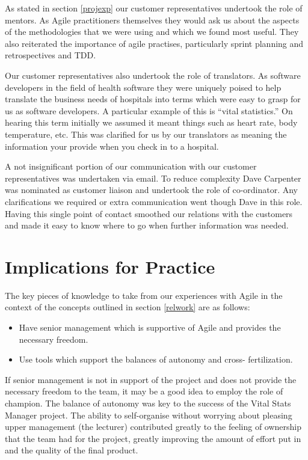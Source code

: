 \documentclass[conference]{IEEEtran}
\begin{document}
As stated in section \ref{projexp} our customer representatives undertook the
role of mentors. As Agile practitioners themselves they would ask us about the
aspects of the methodologies that we were using and which we found most useful.
They also reiterated the importance of agile practises, particularly sprint
planning and retrospectives and TDD.

Our customer representatives also undertook the role of translators. As software
developers in the field of health software they were uniquely poised to help
translate the business needs of hospitals into terms which were easy to grasp
for us as software developers. A particular example of this is ``vital
statistics.'' On hearing this term initially we assumed it meant things such as
heart rate, body temperature, etc. This was clarified for us by our translators
as meaning the information your provide when you check in to a hospital.

A not insignificant portion of our communication with our customer
representatives was undertaken via email. To reduce complexity Dave Carpenter
was nominated as customer liaison and undertook the role of co-ordinator. Any
clarifications we required or extra communication went though Dave in this role.
Having this single point of contact smoothed our relations with the customers
and made it easy to know where to go when further information was needed.

\section{Implications for Practice}

The key pieces of knowledge to take from our experiences with Agile in the
context of the concepts outlined in section \ref{relwork} are as follows:

\begin{itemize}

  \item Have senior management which is supportive of Agile and provides the
necessary freedom.

  \item Use tools which support the balances of autonomy and cross-
fertilization.

\end{itemize}

If senior management is not in support of the project and does not provide the
necessary freedom to the team, it may be a good idea to employ the role of
champion. The balance of autonomy was key to the success of the Vital Stats
Manager project. The ability to self-organise without worrying about pleasing
upper management (the lecturer) contributed greatly to the feeling of ownership
that the team had for the project, greatly improving the amount of effort put in
and the quality of the final product.
\end{document}
